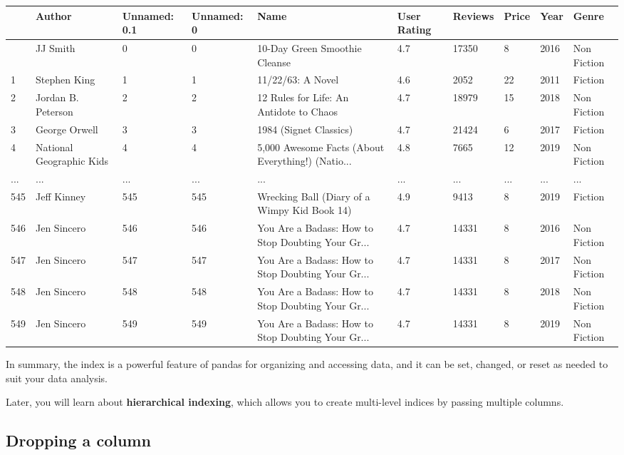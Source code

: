 \documentclass[
  letterpaper,
  DIV=11,
  numbers=noendperiod]{scrreprt}
\begin{document}
\begin{longtable}[]{@{}llllllllll@{}}
\toprule\noalign{}
& Author & Unnamed: 0.1 & Unnamed: 0 & Name & User Rating & Reviews &
Price & Year & Genre \\
\midrule\noalign{}
\endhead
\bottomrule\noalign{}
\endlastfoot
0 & JJ Smith & 0 & 0 & 10-Day Green Smoothie Cleanse & 4.7 & 17350 & 8 &
2016 & Non Fiction \\
1 & Stephen King & 1 & 1 & 11/22/63: A Novel & 4.6 & 2052 & 22 & 2011 &
Fiction \\
2 & Jordan B. Peterson & 2 & 2 & 12 Rules for Life: An Antidote to Chaos
& 4.7 & 18979 & 15 & 2018 & Non Fiction \\
3 & George Orwell & 3 & 3 & 1984 (Signet Classics) & 4.7 & 21424 & 6 &
2017 & Fiction \\
4 & National Geographic Kids & 4 & 4 & 5,000 Awesome Facts (About
Everything!) (Natio... & 4.8 & 7665 & 12 & 2019 & Non Fiction \\
... & ... & ... & ... & ... & ... & ... & ... & ... & ... \\
545 & Jeff Kinney & 545 & 545 & Wrecking Ball (Diary of a Wimpy Kid Book
14) & 4.9 & 9413 & 8 & 2019 & Fiction \\
546 & Jen Sincero & 546 & 546 & You Are a Badass: How to Stop Doubting
Your Gr... & 4.7 & 14331 & 8 & 2016 & Non Fiction \\
547 & Jen Sincero & 547 & 547 & You Are a Badass: How to Stop Doubting
Your Gr... & 4.7 & 14331 & 8 & 2017 & Non Fiction \\
548 & Jen Sincero & 548 & 548 & You Are a Badass: How to Stop Doubting
Your Gr... & 4.7 & 14331 & 8 & 2018 & Non Fiction \\
549 & Jen Sincero & 549 & 549 & You Are a Badass: How to Stop Doubting
Your Gr... & 4.7 & 14331 & 8 & 2019 & Non Fiction \\
\end{longtable}

In summary, the index is a powerful feature of pandas for organizing and
accessing data, and it can be set, changed, or reset as needed to suit
your data analysis.

Later, you will learn about \textbf{hierarchical indexing}, which allows
you to create multi-level indices by passing multiple columns.

\hypertarget{dropping-a-column}{%
\subsection{Dropping a column}\label{dropping-a-column}}
\end{document}
